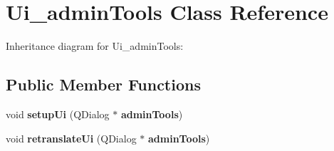 \section{Ui\+\_\+admin\+Tools Class Reference}
\label{class_ui__admin_tools}


Inheritance diagram for Ui\+\_\+admin\+Tools\+:
\subsection*{Public Member Functions}
\begin{DoxyCompactItemize}
\item 
\mbox{\label{class_ui__admin_tools_a7d4f82cf818f6fba71629520e8b831a8}} 
void {\bfseries setup\+Ui} (Q\+Dialog $\ast$\textbf{ admin\+Tools})
\item 
\mbox{\label{class_ui__admin_tools_a087db216e7a3378f3a856a49f7eb9ff1}} 
void {\bfseries retranslate\+Ui} (Q\+Dialog $\ast$\textbf{ admin\+Tools})
\end{DoxyCompactItemize}
